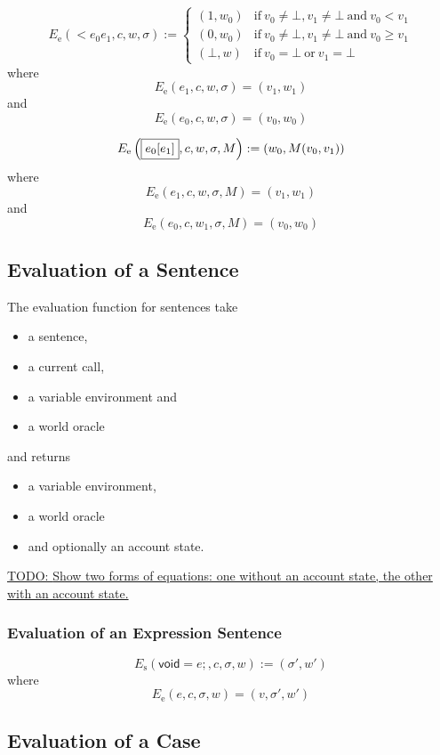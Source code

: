 \documentclass{book}
\newcommand{\todo}[1]{\underline{TODO: {#1}}}
\newcommand{\evalE}[1]{E_\mathrm{e}\left({#1}\right)}
\newcommand{\evalS}[1]{E_\mathrm{s}\left({#1}\right)}
\newcommand{\expressionsentence}[1]{\mathsf{void}={#1}\mathsf{;}}
\begin{document}
\[
\evalE{\boxed{\lt{e_0}{e_1}}, c, w, \sigma} :=
\begin{cases}
  (1, w_0) &\text{if}\ v_0 \neq \bot, v_1 \neq\bot\ \text{and}\ v_0 < v_1 \\
  (0, w_0) &\text{if}\ v_0 \neq \bot, v_1 \neq\bot\ \text{and}\ v_0 \ge v_1 \\
  (\bot, w) &\text{if}\ v_0 = \bot \ \text{or}\ v_1 = \bot
\end{cases}
\]
where
\[
\evalE{\boxed{e_1}, c, w, \sigma} = (v_1, w_1)
\]
and
\[
\evalE{\boxed{e_0}, c, w, \sigma} = (v_0, w_0)
\]

\[
\evalE{\boxed{\arrayAccess{e_0}{e_1}}, c, w, \sigma, M} :=
(w_0, M(v_0, v_1))
\]
where
\[
\evalE{\boxed{e_1}, c, w, \sigma, M} = (v_1, w_1)
\]
and
\[
\evalE{\boxed{e_0}, c, w_1, \sigma, M} = (v_0, w_0)
\]

\subsection{Evaluation of a Sentence}

The evaluation function for sentences take
\begin{itemize}
\item a sentence,
\item a current call,
\item a variable environment and
\item a world oracle
\end{itemize}
and returns
\begin{itemize}
\item a variable environment,
\item a world oracle
\item and optionally an account state.
\end{itemize}

\todo{Show two forms of equations: one without an account state, the other with an account state.}

\subsubsection{Evaluation of an Expression Sentence}

\[
\evalS{\boxed{\expressionsentence{e}}, c, \sigma, w} := (\sigma', w')
\]
where
\[
\evalE{\boxed{e}, c, \sigma, w} = (v, \sigma', w')
\]

\subsection{Evaluation of a Case}
\end{document}
